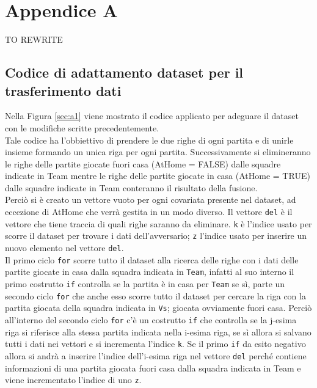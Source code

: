 \chapter{Appendice A}
TO REWRITE
\section{Codice di adattamento dataset per il trasferimento dati}

Nella Figura \ref{sec:a1} viene mostrato il codice applicato per adeguare il dataset con le modifiche scritte precedentemente.\\
Tale codice ha l'obbiettivo di prendere le due righe di ogni partita e di unirle insieme formando un unica riga per ogni partita. Successivamente si elimineranno le righe delle partite giocate fuori casa (\textsf{AtHome} = FALSE) dalle squadre indicate in \textsf{Team} mentre le righe delle partite giocate in casa (\textsf{AtHome} = TRUE) dalle squadre indicate in \textsf{Team} conteranno il risultato della fusione.\\
Perciò si è creato un vettore vuoto per ogni covariata presente nel dataset, ad eccezione di \textsf{AtHome} che verrà gestita in un modo diverso. Il vettore \texttt{del} è il vettore che tiene traccia di quali righe saranno da eliminare. \texttt{k} è l'indice usato per scorre il dataset per trovare i dati dell'avversario; \texttt{z} l'indice usato per inserire un nuovo elemento nel vettore \texttt{del}.\\
Il primo ciclo \texttt{for} scorre tutto il dataset alla ricerca delle righe con i dati delle partite giocate in casa dalla squadra indicata in \texttt{Team}, infatti al suo interno il primo costrutto \texttt{if} controlla se la partita è in casa per \texttt{Team} se sì, parte un secondo ciclo \texttt{for} che anche esso scorre tutto il dataset per cercare la riga con la partita giocata della squadra indicata in \texttt{Vs}; giocata ovviamente fuori casa. Perciò all'interno del secondo ciclo \texttt{for} c'è un costrutto \texttt{if} che controlla se la j-esima riga si riferisce alla stessa partita indicata nella i-esima riga, se sì allora si salvano tutti i dati nei vettori e si incrementa l'indice \texttt{k}. Se il primo \texttt{if} da esito negativo allora si andrà a inserire l'indice dell'i-esima riga nel vettore \texttt{del} perché contiene informazioni di una partita giocata fuori casa dalla squadra indicata in \textsf{Team} e viene incrementato l'indice di uno \texttt{z}.\\

